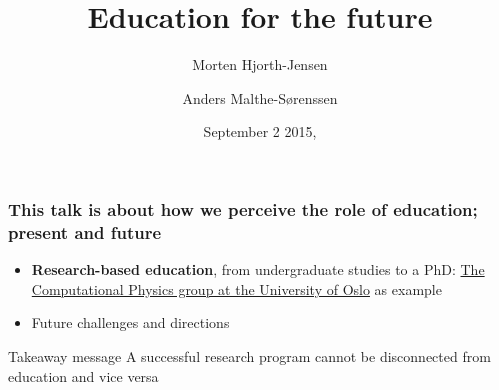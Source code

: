 \documentclass{beamer}
\begin{document}







\title{Education for the future}


\author{Morten Hjorth-Jensen
\and
Anders Malthe-Sørenssen}

\date{September 2 2015,
}

\begin{frame}
\titlepage
\end{frame}

\begin{frame}
\frametitle{This talk is about how we perceive the role of education; present and future}

\begin{block}{}

\begin{itemize}
\item \textbf{Research-based education}, from undergraduate studies to a PhD: \href{{http://www.mn.uio.no/fysikk/english/research/groups/computational/index.html}}{The Computational Physics group at the University of Oslo} as example

\item Future challenges and directions
\end{itemize}

\noindent
\end{block}
\begin{block}{Takeaway message }
A successful research program cannot be disconnected from education and vice versa
\end{block}
\end{frame}
\end{document}
